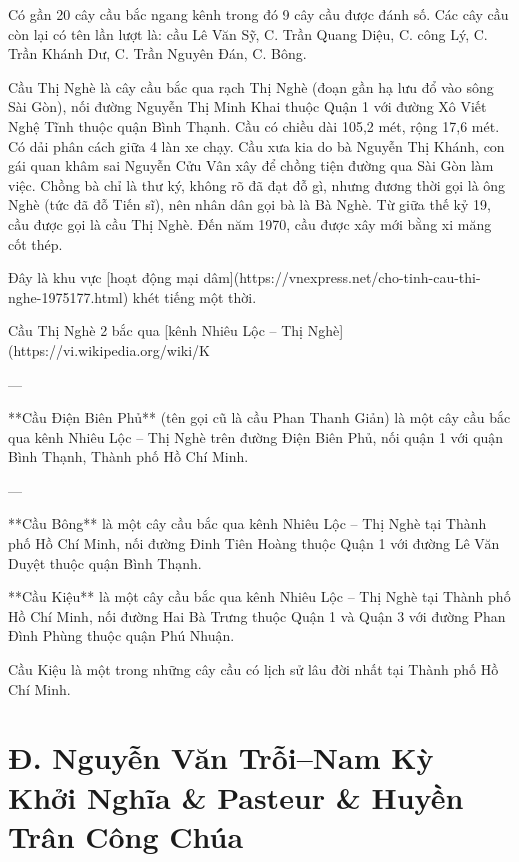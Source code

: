 Có gần 20 cây cầu bắc ngang kênh trong đó 9 cây cầu được đánh số. Các cây cầu còn lại có tên lần lượt là: cầu Lê Văn Sỹ, C. Trần Quang Diệu, C. công Lý, C. Trần Khánh Dư, C. Trần Nguyên Đán, C. Bông.

Cầu Thị Nghè là cây cầu bắc qua rạch Thị Nghè (đoạn gần hạ lưu đổ vào sông Sài Gòn), nối đường Nguyễn Thị Minh Khai thuộc Quận 1 với đường Xô Viết Nghệ Tĩnh thuộc quận Bình Thạnh. Cầu có chiều dài 105,2 mét, rộng 17,6 mét. Có dải phân cách giữa 4 làn xe chạy. Cầu xưa kia do bà Nguyễn Thị Khánh, con gái quan khâm sai Nguyễn Cửu Vân xây để chồng tiện đường qua Sài Gòn làm việc. Chồng bà chỉ là thư ký, không rõ đã đạt đỗ gì, nhưng đương thời gọi là ông Nghè (tức đã đỗ Tiến sĩ), nên nhân dân gọi bà là Bà Nghè. Từ giữa thế kỷ 19, cầu được gọi là cầu Thị Nghè. Đến năm 1970, cầu được xây mới bằng xi măng cốt thép.

Đây là khu vực [hoạt động mại dâm](https://vnexpress.net/cho-tinh-cau-thi-nghe-1975177.html) khét tiếng một thời.

Cầu Thị Nghè 2 bắc qua [kênh Nhiêu Lộc – Thị Nghè](https://vi.wikipedia.org/wiki/K%

---

**Cầu Điện Biên Phủ** (tên gọi cũ là cầu Phan Thanh Giản) là một cây cầu bắc qua kênh Nhiêu Lộc – Thị Nghè trên đường Điện Biên Phủ, nối quận 1 với quận Bình Thạnh, Thành phố Hồ Chí Minh.

---

**Cầu Bông** là một cây cầu bắc qua kênh Nhiêu Lộc – Thị Nghè tại Thành phố Hồ Chí Minh, nối đường Đinh Tiên Hoàng thuộc Quận 1 với đường Lê Văn Duyệt thuộc quận Bình Thạnh.

**Cầu Kiệu** là một cây cầu bắc qua kênh Nhiêu Lộc – Thị Nghè tại Thành phố Hồ Chí Minh, nối đường Hai Bà Trưng thuộc Quận 1 và Quận 3 với đường Phan Đình Phùng thuộc quận Phú Nhuận.

Cầu Kiệu là một trong những cây cầu có lịch sử lâu đời nhất tại Thành phố Hồ Chí Minh.

\section{Đ. Nguyễn Văn Trỗi--Nam Kỳ Khởi Nghĩa \& Pasteur \& Huyền Trân Công Chúa}

